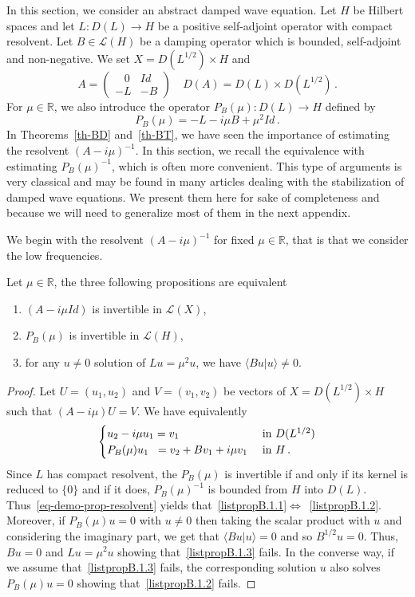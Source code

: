 \documentclass[AHL,Unicode,longabstracts]{cedram}
\newcommand{\RR}{\mathbb{R}}
\newcommand{\Lc}{\mathcal{L}}
\newcommand*{\romanenumi}{\renewcommand*{\theenumi}{\roman{enumi}}}
\begin{document}
In this section, we consider an abstract damped wave equation. Let $H$ be Hilbert spaces and let $L:D(L)\rightarrow H$ be a positive self-adjoint operator with compact resolvent. Let $B\in\Lc(H)$ be a damping operator which is bounded, self-adjoint and non-negative. We set $X=D(L^{1/2})\times H$ and
\[
A=
\begin{pmatrix}
 \;\;\;0 & Id \\ -L & -B
\end{pmatrix}\quad D(A)=D(L)\times D(L^{1/2})\,.
\]
For $\mu\in\RR$, we also introduce the operator $P_B(\mu):D(L)\rightarrow H$ defined by
\[
P_B(\mu)=-L-i\mu B +\mu^2 Id\,.
\]
In Theorems~\ref{th-BD} and~\ref{th-BT}, we have seen the importance of estimating the resolvent $(A-i\mu)^{-1}$. In this section, we recall the equivalence with estimating $P_B(\mu)^{-1}$, which is often more convenient. This type of arguments is very classical and may be found in many articles dealing with the stabilization of damped wave equations. We present them here for sake of completeness and because we will need to generalize most of them in the next appendix.

We begin with the resolvent $(A-i\mu)^{-1}$ for fixed $\mu\in\RR$, that is that we consider the low frequencies.

\begin{prop}\label{prop-resolvent}
Let $\mu\in\RR$, the three following propositions are equivalent
\begin{enumerate}\romanenumi
\item \label{listpropB.1.1}$(A-i\mu Id)$ is invertible in $\Lc(X)$,
\item \label{listpropB.1.2}$P_B(\mu)$ is invertible in $\Lc(H)$,
\item \label{listpropB.1.3}for any $u\neq 0$ solution of $Lu=\mu^2 u$, we have $\langle Bu|u\rangle\neq 0$.
\end{enumerate}
\end{prop}
\begin{proof}
Let $U=(u_1,u_2)$ and $V=(v_1,v_2)$ be vectors of $X= D(L^{1/2})\times H$ such that $(A- i\mu)U=V$. We have equivalently
\begin{equation}\label{eq-demo-prop-resolvent}
\begin{cases}
u_2 -i\mu u_1 = v_1 & \text{ in }D(L^{1/2})\\
P_B(\mu) u_1 \mkern 10mu = v_2 + B v_1 + i \mu v_1&\text{ in }H\,.
\end{cases}
\end{equation}
Since $L$ has compact resolvent, the $P_B(\mu)$ is invertible if and only if its kernel is reduced to $\{0\}$ and if it does, $P_B(\mu)^{-1}$ is bounded from $H$ into $D(L)$. Thus~\eqref{eq-demo-prop-resolvent} yields that~\eqref{listpropB.1.1}$\Leftrightarrow$~\eqref{listpropB.1.2}. Moreover, if $P_B(\mu)u=0$ with $u\neq 0$ then taking the scalar product with $u$ and considering the imaginary part, we get that $\langle Bu|u\rangle=0$ and so $B^{1/2}u=0$. Thus, $Bu=0$ and $Lu=\mu^2 u$ showing that~\eqref{listpropB.1.3} fails. In the converse way, if we assume that~\eqref{listpropB.1.3} fails, the corresponding solution $u$ also solves $P_B(\mu)u=0$ showing that~\eqref{listpropB.1.2} fails.
\end{proof}
\end{document}

